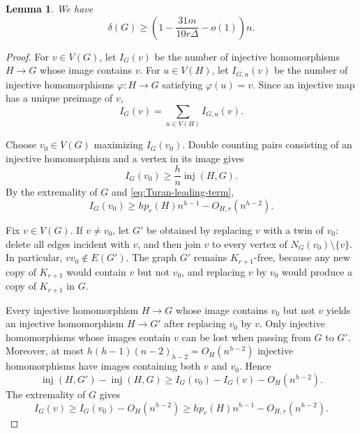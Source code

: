 \documentclass[11pt]{article}
\numberwithin{equation}{section}
\newtheorem{lemma}[theorem]{Lemma}
\theoremstyle{definition}
\theoremstyle{remark}
\newcommand{\inj}{\operatorname{inj}}
\begin{document}
\begin{lemma}
\label{lem:calibration}
We have
\[
\delta(G)\ge
\left(1-\frac{31m}{10r\Delta}-o(1)\right)n.
\]
\end{lemma}

\begin{proof}
For $v\in V(G)$, let $I_G(v)$ be the number of injective homomorphisms $H\to G$ whose image contains $v$. For $u\in V(H)$, let $I_{G,u}(v)$ be the number of injective homomorphisms $\varphi:H\to G$ satisfying $\varphi(u)=v$. Since an injective map has a unique preimage of $v$,
\begin{equation}
\label{eq:rooted-decompose}
I_G(v)=\sum_{u\in V(H)}I_{G,u}(v).
\end{equation}

Choose $v_0\in V(G)$ maximizing $I_G(v_0)$. Double counting pairs consisting of an injective homomorphism and a vertex in its image gives
\[
I_G(v_0)\ge \frac{h}{n}\inj(H,G).
\]
By the extremality of $G$ and \eqref{eq:Turan-leading-term},
\[
I_G(v_0)\ge hp_r(H)n^{h-1}-O_{H,r}(n^{h-2}).
\]

Fix $v\in V(G)$. If $v\ne v_0$, let $G'$ be obtained by replacing $v$ with a twin of $v_0$: delete all edges incident with $v$, and then join $v$ to every vertex of $N_G(v_0)\setminus\{v\}$. In particular, $vv_0\notin E(G')$. The graph $G'$ remains $K_{r+1}$-free, because any new copy of $K_{r+1}$ would contain $v$ but not $v_0$, and replacing $v$ by $v_0$ would produce a copy of $K_{r+1}$ in $G$.

Every injective homomorphism $H\to G$ whose image contains $v_0$ but not $v$ yields an injective homomorphism $H\to G'$ after replacing $v_0$ by $v$. Only injective homomorphisms whose images contain $v$ can be lost when passing from $G$ to $G'$. Moreover, at most $h(h-1)(n-2)_{h-2}=O_H(n^{h-2})$ injective homomorphisms have images containing both $v$ and $v_0$. Hence
\[
\inj(H,G')-\inj(H,G)\ge I_G(v_0)-I_G(v)-O_H(n^{h-2}).
\]
The extremality of $G$ gives
\begin{equation}
\label{eq:all-rooted-lower}
I_G(v)\ge I_G(v_0)-O_H(n^{h-2})
\ge hp_r(H)n^{h-1}-O_{H,r}(n^{h-2}).
\end{equation}


\end{proof}
\end{document}
